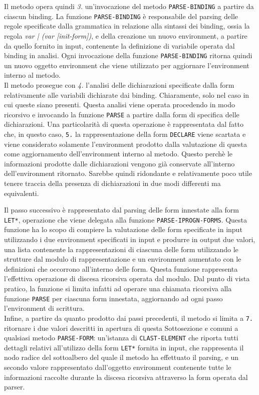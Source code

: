 Il metodo opera quindi \textit{3.} un’invocazione del metodo \texttt
{PARSE-BINDING} a partire da ciascun binding. La funzione \texttt
{PARSE-BINDING} è responsabile del parsing delle regole specificate dalla
grammatica in relazione alla sintassi dei binding, ossia la regola \textit
{var | (var [init-form])}, e della creazione un nuovo environment, a partire da
quello fornito in input, contenente la definizione di variabile operata dal
binding in analisi. Ogni invocazione della funzione \texttt{PARSE-BINDING}
ritorna quindi un nuovo oggetto environment che viene utilizzato per aggiornare
l’environment interno al metodo.\\

Il metodo prosegue con \textit{4.} l’analisi delle dichiarazioni specificate
dalla form relativamente alle variabili dichiarate dai binding. Chiaramente,
solo nel caso in cui queste siano presenti. Questa analisi viene operata
procedendo in modo ricorsivo e invocando la funzione \texttt{PARSE} a partire
dalla form di specifica delle dichiarazioni. Una particolarità di questa
operazione è rappresentata dal fatto che, in questo caso, \texttt{5.} la
rappresentazione della form \texttt{DECLARE} viene scartata e viene considerato
solamente l'environment prodotto dalla valutazione di questa come aggiornamento
dell'environment interno al metodo. Questo perchè le informazioni prodotte dalle
dichiarazioni vengono già conservate all'interno dell'environment ritornato.
Sarebbe quindi ridondante e relativamente poco utile tenere traccia della
presenza di dichiarazioni in due modi differenti ma equivalenti.

Il passo successivo è rappresentato dal parsing delle form innestate alla form
\texttt{LET*}, operazione che viene delegata alla funzione \texttt
{PARSE-IPROGN-FORMS}. Questa funzione ha lo scopo di compiere la valutazione
delle form specificate in input utilizzando i due environment specificati in
input e produrre in output due valori, una lista contenente la rappresentazioni
di ciascuna delle form utilizzando le strutture dal modulo di rappresentazione e
un environment aumentato con le definizioni che occorrono all’interno delle
form. Questa funzione rappresenta l'effettiva operazione di discesa ricorsiva
operata dal modulo. Dal punto di vista pratico, la funzione si limita infatti ad
operare una chiamata ricorsiva alla funzione \texttt{PARSE} per ciascuna form
innestata, aggiornando ad ogni passo l'environment di scrittura.\\

Infine, a partire da quanto prodotto dai passi precedenti, il metodo si limita
a \texttt{7.} ritornare i due valori descritti in apertura di questa
Sottosezione e comuni a qualsiasi metodo \texttt{PARSE-FORM}: un'istanza di
\texttt{CLAST-ELEMENT} che riporta tutti dettagli relativi all'utilizzo della
form \texttt{LET*} fornita in input, che rappresenta il nodo radice del
sottoalbero del quale il metodo ha effettuato il parsing, e un secondo valore
rappresentato dall'oggetto environment contenente tutte le informazioni
raccolte durante la discesa ricorsiva attraverso la form operata dal parser.\\

